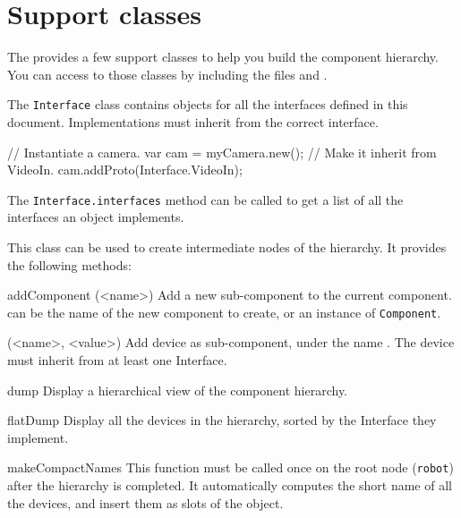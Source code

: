\section{Support classes}
The \usdk provides a few support \us classes to help you build the component
hierarchy.  You can access to those classes by including the files
 and .


The \lstinline{Interface} class contains \us objects for all the interfaces
defined in this document. Implementations must inherit from the correct
interface.

\begin{urbiunchecked}
// Instantiate a camera.
var cam = myCamera.new();
// Make it inherit from VideoIn.
cam.addProto(Interface.VideoIn);
\end{urbiunchecked}

The \lstinline{Interface.interfaces} method can be called to get a list of
all the interfaces an object implements.


This class can be used to create intermediate nodes of the hierarchy. It
provides the following methods:

\begin{urbiscriptapi}
\item[addComponent](<name>)%
  Add a new sub-component to the current component.  can
  be the name of the new component to create, or an instance of
  \lstinline{Component}.


\item[addDevice](<name>, <value>)%
  Add device  as sub-component, under the name . The
  device must inherit from at least one Interface.


\item[dump]%
  Display a hierarchical view of the component hierarchy.


\item[flatDump]%
  Display all the devices in the hierarchy, sorted by the Interface
  they implement.


\item[makeCompactNames]%
  This function must be called once on the root node (\lstinline{robot})
  after the hierarchy is completed.  It automatically computes the short
  name of all the devices, and insert them as slots of the
   object.
\end{urbiscriptapi}

